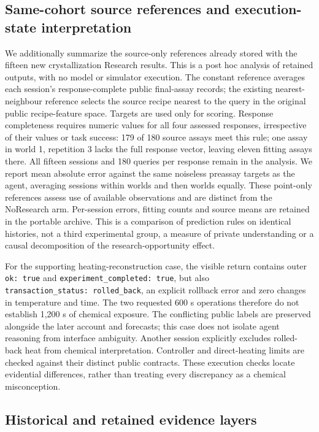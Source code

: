 \documentclass[12pt,a4paper]{article}
\begin{document}
\subsection{Same-cohort source references and execution-state interpretation}\label{same-cohort-source-references-and-execution-state-interpretation}

We additionally summarize the source-only references already stored with the fifteen new crystallization Research results. This is a post hoc analysis of retained outputs, with no model or simulator execution. The constant reference averages each session's response-complete public final-assay records; the existing nearest-neighbour reference selects the source recipe nearest to the query in the original public recipe-feature space. Targets are used only for scoring. Response completeness requires numeric values for all four assessed responses, irrespective of their values or task success: 179 of 180 source assays meet this rule; one assay in world 1, repetition 3 lacks the full response vector, leaving eleven fitting assays there. All fifteen sessions and 180 queries per response remain in the analysis. We report mean absolute error against the same noiseless preassay targets as the agent, averaging sessions within worlds and then worlds equally. These point-only references assess use of available observations and are distinct from the NoResearch arm. Per-session errors, fitting counts and source means are retained in the portable archive. This is a comparison of prediction rules on identical histories, not a third experimental group, a measure of private understanding or a causal decomposition of the research-opportunity effect.

For the supporting heating-reconstruction case, the visible return contains outer \texttt{ok:\ true} and \texttt{experiment\_completed:\ true}, but also \texttt{transaction\_status:\ rolled\_back}, an explicit rollback error and zero changes in temperature and time. The two requested 600 s operations therefore do not establish 1,200 s of chemical exposure. The conflicting public labels are preserved alongside the later account and forecasts; this case does not isolate agent reasoning from interface ambiguity. Another session explicitly excludes rolled-back heat from chemical interpretation. Controller and direct-heating limits are checked against their distinct public contracts. These execution checks locate evidential differences, rather than treating every discrepancy as a chemical misconception.

\subsection{Historical and retained evidence layers}\label{historical-and-retained-evidence-layers}
\end{document}
